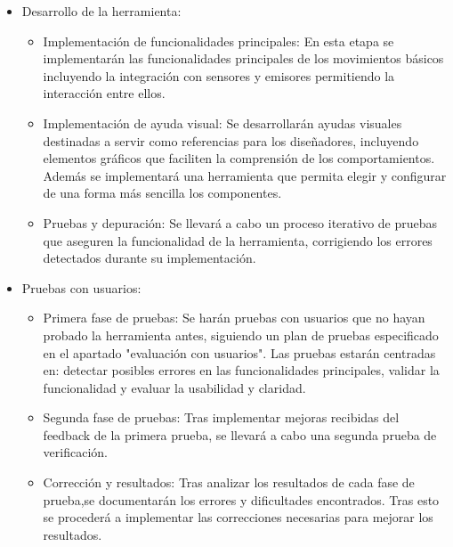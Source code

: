 \begin{itemize}
    \item Desarrollo de la herramienta: 
	\begin{itemize}
	    \item  Implementación de funcionalidades principales: En esta etapa se implementarán las funcionalidades principales de los movimientos básicos incluyendo la integración con sensores y emisores permitiendo la interacción entre ellos.
	    \item Implementación de ayuda visual: Se desarrollarán ayudas visuales destinadas a servir como referencias para los diseñadores, incluyendo elementos gráficos que faciliten la comprensión de los comportamientos. Además se implementará una herramienta que permita elegir y configurar de una forma más sencilla los componentes.
	    \item Pruebas y depuración: Se llevará a cabo un proceso iterativo de pruebas que aseguren la funcionalidad de la herramienta, corrigiendo los errores detectados durante su implementación.
	\end{itemize}
    \item Pruebas con usuarios:
	\begin{itemize}
	    \item Primera fase de pruebas: Se harán pruebas con usuarios que no hayan probado la herramienta antes, siguiendo un plan de pruebas especificado en el apartado "evaluación con usuarios". Las pruebas estarán centradas en: detectar posibles errores en las funcionalidades principales, validar la funcionalidad y evaluar la usabilidad y claridad.
	    \item Segunda fase de pruebas: Tras implementar mejoras recibidas del feedback de la primera prueba, se llevará a cabo una segunda prueba de verificación.
	    \item Corrección y resultados: Tras analizar los resultados de cada fase de prueba,se documentarán los errores y dificultades encontrados. Tras esto se procederá a implementar las correcciones necesarias para mejorar los resultados. 
	\end{itemize}

\end{itemize}
